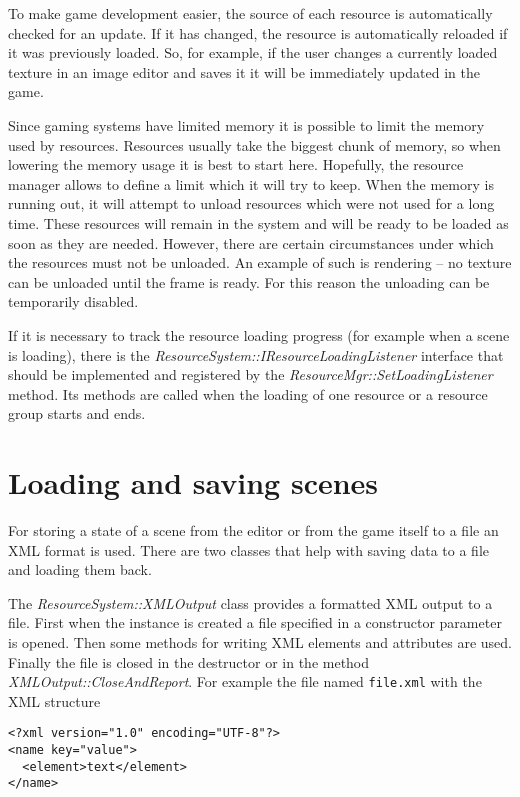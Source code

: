 To make game development easier, the source of each resource is automatically checked for an update. If it has changed, the resource is automatically reloaded if it was previously loaded. So, for example, if the user changes a currently loaded texture in an image editor and saves it it will be immediately updated in the game.

Since gaming systems have limited memory it is possible to limit the memory used by resources. Resources usually take the biggest chunk of memory, so when lowering the memory usage it is best to start here. Hopefully, the resource manager allows to define a limit which it will try to keep. When the memory is running out, it will attempt to unload resources which were not used for a long time. These resources will remain in the system and will be ready to be loaded as soon as they are needed. However, there are certain circumstances under which the resources must not be unloaded. An example of such is rendering -- no texture can be unloaded until the frame is ready. For this reason the unloading can be temporarily disabled.

If it is necessary to track the resource loading progress (for example when a scene is loading), there is the \emph{ResourceSystem::IResourceLoadingListener} interface that should be implemented and registered by the \emph{ResourceMgr\-::\-Set\-Loading\-Listener} method. Its methods are called when the loading of one resource or a resource group starts and ends.

\section{Loading and saving scenes}

For storing a state of a scene from the editor or from the game itself to a file an XML format is used. There are two classes that help with saving data to a file and loading them back.

The \emph{ResourceSystem::XMLOutput} class provides a formatted XML output to a file. First when the instance is created a file specified in a constructor parameter is opened. Then some methods for writing XML elements and attributes are used. Finally the file is closed in the destructor or in the method \emph{XMLOutput::CloseAndReport}. For example the file named \verb/file.xml/ with the XML structure

\begin{verbatim}
<?xml version="1.0" encoding="UTF-8"?>
<name key="value">
  <element>text</element>
</name>
\end{verbatim}

